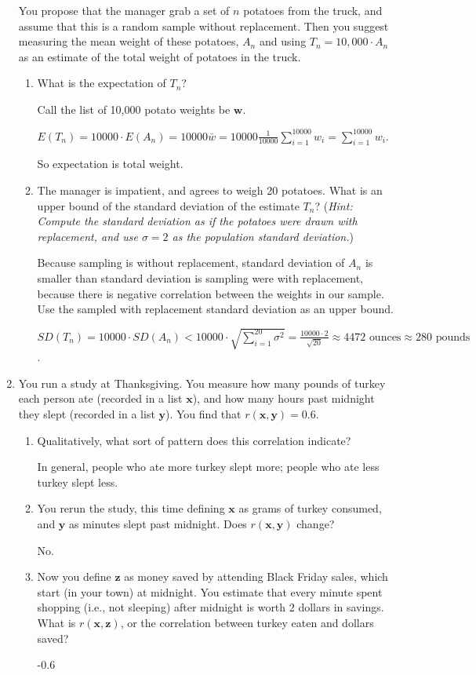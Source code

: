 \documentclass[11pt]{article}
\begin{document}
\begin{enumerate}
You propose that the manager grab a set of $n$ potatoes from the truck, and assume that this is a random sample without replacement. Then you suggest measuring the mean weight of these potatoes, $A_n$ and using $T_n = 10,000 \cdot A_n$ as an estimate of the total weight of potatoes in the truck.

\begin{enumerate}
\item What is the expectation of $T_n$?

{\color{red} Call the list of 10,000 potato weights be $\bm w$.

$E(T_n) = 10000 \cdot E(A_n) = 10000 \bar w = 10000 \frac{1}{10000} \sum_{i=1}^{10000} w_i = \sum_{i=1}^{10000} w_i$.

So expectation is total weight.}
\item The manager is impatient, and agrees to weigh 20 potatoes. What is an upper bound of the standard deviation of the estimate $T_n$? (\emph{Hint: Compute the standard deviation as if the potatoes were drawn with replacement, and use $\sigma = 2$ as the population standard deviation.})
{\color{red}
Because sampling is without replacement, standard deviation of $A_n$ is smaller than standard deviation is sampling were with replacement, because there is negative correlation between the weights in our sample. Use the sampled with replacement standard deviation as an upper bound.

$SD(T_n) = 10000 \cdot SD(A_n) < 10000 \cdot \sqrt{\sum_{i=1}^{20} \sigma^2} = \frac{10000 \cdot 2}{\sqrt{20}} \approx 4472 \textrm{ ounces} \approx 280 \textrm{ pounds}$.}
\end{enumerate}

\item You run a study at Thanksgiving. You measure how many pounds of turkey each person ate (recorded in a list $\bm x$), and how many hours past midnight they slept (recorded in a list $\bm y$). You find that $r(\bm x, \bm y) = 0.6$.
\begin{enumerate}
\item Qualitatively, what sort of pattern does this correlation indicate?

{\color{red}
  In general, people who ate more turkey slept more; people who ate less turkey slept less.   
}
\item You rerun the study, this time defining $\bm x$ as grams of turkey consumed, and $\bm y$ as minutes slept past midnight. Does $r(\bm x, \bm y)$ change?

{\color{red} No.}

\item Now you define $\bm z$ as money saved by attending Black Friday sales, which start (in your town) at midnight. You estimate that every minute spent shopping (i.e., not sleeping) after midnight is worth 2 dollars in savings. What is $r(\bm x, \bm z)$, or the correlation between turkey eaten and dollars saved?

{\color{red} -0.6}
\end{enumerate}
\end{enumerate}
\end{document}
